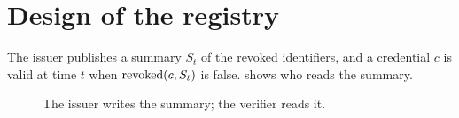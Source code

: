 \chapter{Design of the registry}\label{chap:design}

The issuer publishes a summary $S_t$ of the revoked identifiers, and a credential $c$ is valid at
time $t$ when $\operatorname{revoked}(c, S_t)$ is false.  shows who reads the summary.

\begin{figure}[!ht]
  \centering
  
  \caption{The issuer writes the summary; the verifier reads it.}
  \label{fig:flow}
\end{figure}
